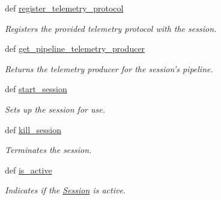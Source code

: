 \begin{DoxyCompactItemize}
def \hyperlink{classhwm_1_1sessions_1_1session_1_1_session_a5079765b5b9e9b107615de01615bdc8a}{register\-\_\-telemetry\-\_\-protocol}
\begin{DoxyCompactList}\small\item\em Registers the provided telemetry protocol with the session. \end{DoxyCompactList}\item 
def \hyperlink{classhwm_1_1sessions_1_1session_1_1_session_aa63aa265e8f4cf8a2d8cff5b0899bc05}{get\-\_\-pipeline\-\_\-telemetry\-\_\-producer}
\begin{DoxyCompactList}\small\item\em Returns the telemetry producer for the session's pipeline. \end{DoxyCompactList}\item 
def \hyperlink{classhwm_1_1sessions_1_1session_1_1_session_af47ab747d5daf47d54893fe4af954ca0}{start\-\_\-session}
\begin{DoxyCompactList}\small\item\em Sets up the session for use. \end{DoxyCompactList}\item 
def \hyperlink{classhwm_1_1sessions_1_1session_1_1_session_ac31271ee658c6fb54feba36024b76781}{kill\-\_\-session}
\begin{DoxyCompactList}\small\item\em Terminates the session. \end{DoxyCompactList}\item 
def \hyperlink{classhwm_1_1sessions_1_1session_1_1_session_a7f096ca20400296cba0f4299316c3777}{is\-\_\-active}
\begin{DoxyCompactList}\small\item\em Indicates if the \hyperlink{classhwm_1_1sessions_1_1session_1_1_session}{Session} is active. \end{DoxyCompactList}\end{DoxyCompactItemize}
